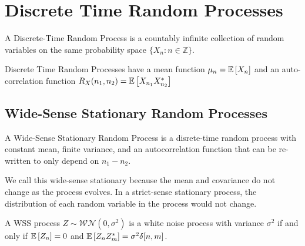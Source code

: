 \section{Discrete Time Random Processes}
\begin{definition}
	A Discrete-Time Random Process is a countably infinite collection of random variables on the same probability space $\{X_n: n\in\mathbb{Z}\}$.
	\label{defn:discrete-time-rp}
\end{definition}
Discrete Time Random Processes have a mean function $\mu_n = \mathbb{E}\left[X_n\right]$ and an auto-correlation function $R_X(n_1, n_2) = \mathbb{E}\left[X_{n_1}X_{n_2}^*\right]$
\subsection{Wide-Sense Stationary Random Processes}
\begin{definition}
	A Wide-Sense Stationary Random Process is a disrete-time random process with constant mean, finite variance, and an autocorrelation function that can be re-written to only depend on $n_1-n_2$.
	\label{defn:wss-process}
\end{definition}
We call this wide-sense stationary because the mean and covariance do not change as the process evolves.
In a strict-sense stationary process, the distribution of each random variable in the process would not change.
\begin{definition}
	A WSS process $Z\sim \mathcal{WN}(0, \sigma^2)$ is a white noise process with variance $\sigma^2$ if and only if $\mathbb{E}\left[Z_n\right] = 0$ and $\mathbb{E}\left[Z_nZ_m^*\right] = \sigma^2\delta[n, m]$.
	\label{defn:white-noise-process}
\end{definition}
